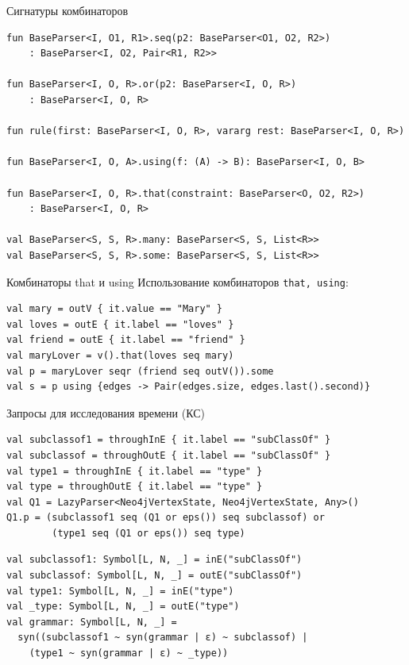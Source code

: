 \documentclass[aspectratio=169]{beamer}
\begin{document}
\appendix


\begin{frame}[fragile]{Сигнатуры комбинаторов}

  \begin{verbatim}
fun BaseParser<I, O1, R1>.seq(p2: BaseParser<O1, O2, R2>)
    : BaseParser<I, O2, Pair<R1, R2>>

fun BaseParser<I, O, R>.or(p2: BaseParser<I, O, R>)
    : BaseParser<I, O, R>

fun rule(first: BaseParser<I, O, R>, vararg rest: BaseParser<I, O, R>)

fun BaseParser<I, O, A>.using(f: (A) -> B): BaseParser<I, O, B>

fun BaseParser<I, O, R>.that(constraint: BaseParser<O, O2, R2>)
    : BaseParser<I, O, R> 
    
val BaseParser<S, S, R>.many: BaseParser<S, S, List<R>>
val BaseParser<S, S, R>.some: BaseParser<S, S, List<R>>
\end{verbatim}
\end{frame}


\begin{frame}[fragile]{Комбинаторы that и using}
  Использование комбинаторов \texttt{that, using}:
  \begin{verbatim}
val mary = outV { it.value == "Mary" }
val loves = outE { it.label == "loves" }
val friend = outE { it.label == "friend" }
val maryLover = v().that(loves seq mary)
val p = maryLover seqr (friend seq outV()).some
val s = p using {edges -> Pair(edges.size, edges.last().second)}
\end{verbatim}
\end{frame}


\begin{frame}[fragile]{Запросы для исследования времени (КС)}
  \begin{verbatim}
val subclassof1 = throughInE { it.label == "subClassOf" }
val subclassof = throughOutE { it.label == "subClassOf" }
val type1 = throughInE { it.label == "type" }
val type = throughOutE { it.label == "type" }
val Q1 = LazyParser<Neo4jVertexState, Neo4jVertexState, Any>()
Q1.p = (subclassof1 seq (Q1 or eps()) seq subclassof) or
        (type1 seq (Q1 or eps()) seq type)
\end{verbatim}
  \begin{verbatim}
val subclassof1: Symbol[L, N, _] = inE("subClassOf")
val subclassof: Symbol[L, N, _] = outE("subClassOf")
val type1: Symbol[L, N, _] = inE("type")
val _type: Symbol[L, N, _] = outE("type")
val grammar: Symbol[L, N, _] = 
  syn((subclassof1 ~ syn(grammar | ε) ~ subclassof) |
    (type1 ~ syn(grammar | ε) ~ _type))
\end{verbatim}


\end{frame}
\end{document}

